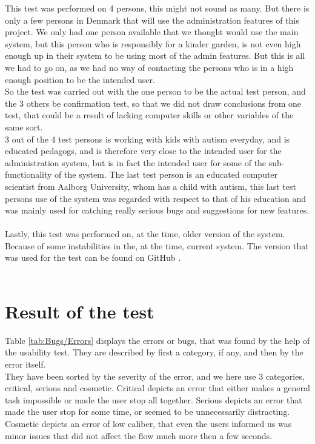 This test was performed on 4 persons, this might not sound as many. But there is only a few persons in Denmark that will use the administration features of this project. We only had one person available that we thought would use the main system, but this person who is responsibly for a kinder garden, is not even high enough up in their system to be using most of the admin features. But this is all we had to go on, as we had no way of contacting the persons who is in a high enough position to be the intended user.\\
So the test was carried out with the one person to be the actual test person, and the 3 others be confirmation test, so that we did not draw conclusions from one test, that could be a result of lacking computer skills or other variables of the same sort.\\
3 out of the 4 test persons is working with kids with autism everyday, and is educated pedagogs, and is therefore very close to the intended user for the administration system, but is in fact the intended user for some of the sub-functionality of the system. The last test person is an educated computer scientist from Aalborg University, whom has a child with autism, this last test persons use of the system was regarded with respect to that of his education and was mainly used for catching really serious bugs and suggestions for new features.\\
\\

Lastly, this test was performed on, at the time, older version of the system. Because of some instabilities in the, at the time, current system. The version that was used for the test can be found on GitHub \citep{testBranch}.\\
\\

\section{Result of the test}
Table \ref{tab:Bugs/Errors} displays the errors or bugs, that was found by the help of the usability test. They are described by first a category, if any, and then by the error itself.\\
They have been sorted by the severity of the error, and we here use 3 categories, critical, serious and cosmetic. Critical depicts an error that either makes a general task impossible or made the user stop all together. Serious depicts an error that made the user stop for some time, or seemed to be unnecessarily distracting. Cosmetic depicts an error of low caliber, that even the users informed us was minor issues that did not affect the flow much more then a few seconds.\\
\\

